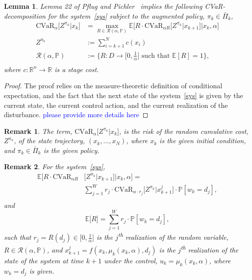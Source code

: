 \documentclass[letterpaper, 10 pt, conference]{ieeeconf}  %
\newtheorem{lemma}{Lemma}
\newtheorem{remark}{Remark}
\begin{document}
\begin{lemma}\label{decomlemma}
Lemma 22 of Pflug and Pichler~\cite{pflug2016time} implies the following CVaR-decomposition for the system~\eqref{sys}
subject to the augmented policy, $\pi_k \in \bar{\Pi}_k$, 
\begin{equation}\label{decomp}\begin{aligned}
\text{CVaR}_\alpha \Big[ Z^{\pi_k} \Big| x_k \Big] & = {\underset{R \in \mathcal{R}(\alpha, \mathbb{P})}\max} \mathbb{E}\Big[ R\cdot \text{CVaR}_{\alpha R}\big[ Z^{\pi_k} \big| x_{k+1}\big] \Big| x_k, \alpha \Big] \\
Z^{\pi_k} & := \sum_{i=k+1}^N c(x_i) \\
\mathcal{R}(\alpha, \mathbb{P}) & := \Big\{ R : D \rightarrow \Big[0, \frac{1}{\alpha}\Big] \text{ such that } \mathbb{E}[R] = 1 \Big\}, \\
\end{aligned}\end{equation}
where $c : \mathbb{R}^n \rightarrow \mathbb{R}$ is a stage cost.
\end{lemma}
\begin{proof}
The proof relies on the measure-theoretic definition of conditional expectation, and the fact that 
the next state of the system~\eqref{sys} is given by the current state, the current control action, and the current realization of the disturbance.
\textcolor{blue}{please provide more details here}
\end{proof}
\begin{remark}
The term, $\text{CVaR}_\alpha \big[ Z^{\pi_k} \big| x_k \big]$, is the risk of 
the random cumulative cost, $Z^{\pi_k}$, of the state trajectory, $(x_k, \dots, x_{N})$, where $x_k$ is the given initial condition, 
and $\pi_k \in \bar{\Pi}_k$ is the given policy.
\end{remark}
\begin{remark}
For the system~\eqref{sys},
\begin{equation*}\begin{aligned}
\mathbb{E}\Big[ R\cdot \text{CVaR}_{\alpha R} & \big[ Z^{\pi_k} \big| x_{k+1}\big] \Big| x_k, \alpha \Big] = \\
& \textstyle\sum_{j=1}^W r_j \cdot \text{CVaR}_{\alpha \cdot r_j}\big[ Z^{\pi_k} \big| x_{k+1}^j \big] \cdot \mathbb{P}[w_k = d_j],\\
\end{aligned}\end{equation*}
and 
$$\mathbb{E}\big[ R ] = \textstyle \sum_{j=1}^W r_j \cdot \mathbb{P}[w_k = d_j],$$
such that $r_j = R(d_j) \in \big[0, \frac{1}{\alpha}\big]$ is the $j$\textsuperscript{th} realization of the random variable, $R \in \mathcal{R}(\alpha, \mathbb{P})$, and 
$x_{k+1}^j = f(x_k, \mu_k(x_k, \alpha), d_j)$ is the $j$\textsuperscript{th} realization of the state
of the system at time $k+1$ under the control, $u_k = \mu_k(x_k, \alpha)$, where $w_k = d_j$ is given.
\end{remark}
\end{document}
